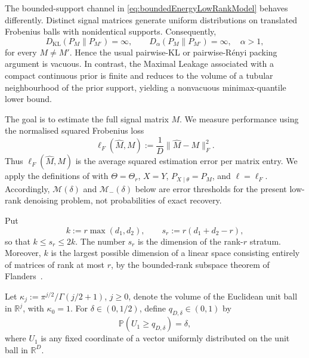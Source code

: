 \documentclass[11pt]{article}
\theoremstyle{definition}
\theoremstyle{remark}
\newcommand{\1}{\boldsymbol{1}}
\begin{document}
The bounded-support channel in
\eqref{eq:boundedEnergyLowRankModel} behaves differently. Distinct signal
matrices generate uniform distributions on translated Frobenius balls with
nonidentical supports. Consequently,
\begin{equation}
D_{\mathrm{KL}}(P_M\|P_{M'})=\infty,
\qquad
D_\alpha(P_M\|P_{M'})=\infty,
\quad \alpha>1,
\label{eq:lowRankPairwiseDivergencesInfinite}
\end{equation}
for every $M\neq M'$. Hence the usual pairwise-KL or pairwise-R\'enyi packing
argument is vacuous. In contrast, the Maximal Leakage associated with a
compact continuous prior is finite and reduces to the volume of a tubular
neighbourhood of the prior support, yielding a nonvacuous minimax-quantile
lower bound.

The goal is to estimate the full signal matrix $M$. We measure performance using the
normalised squared Frobenius loss
\begin{equation}
    \ell_F(\widehat M,M)
    :=
    \frac1D\|\widehat M-M\|_F^2.
\label{eq:boundedEnergyLowRankLoss}
\end{equation}
Thus $\ell_F(\widehat M,M)$ is the average squared estimation error per
matrix entry. We apply the definitions of
 with
\(\Theta=\Theta_r\), \(X=Y\), \(P_{X\mid\theta}=P_M\), and
\(\ell=\ell_F\).
Accordingly, $\mathcal M(\delta)$ and $\mathcal M_-(\delta)$ below are error
thresholds for the present low-rank denoising problem, not probabilities of
exact recovery.

Put
\begin{equation}
    k:=r\max(d_1,d_2),
    \qquad
    s_r:=r(d_1+d_2-r),
\label{eq:lowRankDimensions}
\end{equation}
so that $k\leq s_r\leq2k$. The number $s_r$ is the dimension of the
rank-$r$ stratum. Moreover, $k$ is the largest possible dimension of a
linear space consisting entirely of matrices of rank at most $r$, by the
bounded-rank subspace theorem of Flanders~\cite{Flanders1962}.

Let \(\kappa_j:=\pi^{j/2}/\Gamma(j/2+1)\), \(j\geq0\),
denote the volume of the Euclidean unit ball in $\mathbb R^j$, with
$\kappa_0=1$. For $\delta\in(0,1/2)$, define
$q_{D,\delta}\in(0,1)$ by
\begin{equation}
    \mathbb P(U_1\geq q_{D,\delta})=\delta,
\label{eq:ballCoordinateQuantile}
\end{equation}
where $U_1$ is any fixed coordinate of a vector uniformly distributed on
the unit ball in $\mathbb R^D$.
\end{document}
